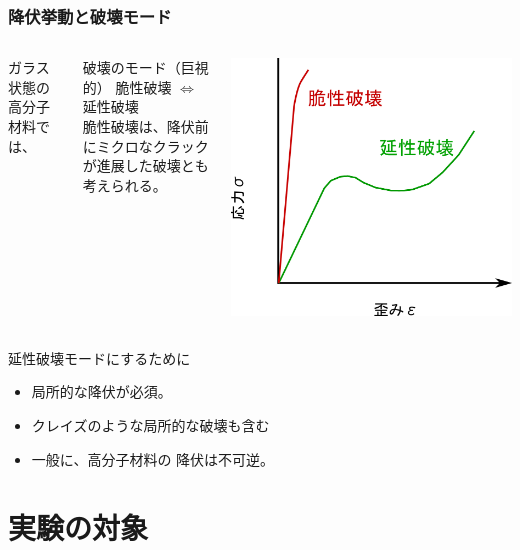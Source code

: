 \documentclass[1４pt, dvipdfmx]{beamer}
\begin{document}
\begin{frame}
\frametitle{降伏挙動と破壊モード}
\begin{columns}[totalwidth=1\textwidth]
ガラス状態の高分子材料では、
\begin{block}{破壊のモード（巨視的）}
脆性破壊 $\Leftrightarrow$ 延性破壊\\
脆性破壊は、降伏前にミクロなクラックが進展した破壊とも考えられる。
\end{block}
	\centering
	\includegraphics[width=.9\textwidth]{S_S_Curve_2.png}
\end{columns}
\begin{exampleblock}{延性破壊モードにするために}
	\begin{itemize}
		\item
		{\color{red} 局所的な降伏}が必須。
		\item
		クレイズのような局所的な破壊も含む
		\item 
		一般に、高分子材料の{\color{red} 降伏は不可逆}。
	\end{itemize}
\end{exampleblock}
\end{frame}

\section{実験の対象}
\end{document}
